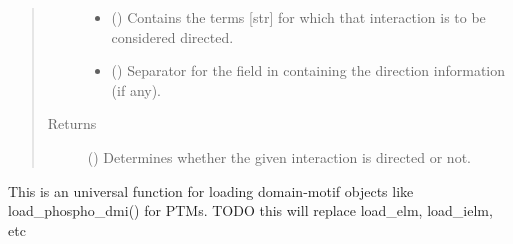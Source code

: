 \documentclass[letterpaper,10pt,english]{sphinxmanual}
\begin{document}
\begin{fulllineitems}
\begin{fulllineitems}
\begin{quote}
\begin{description}
\begin{itemize}
\item {} 
 () \textendash{} Contains the terms {[}str{]} for which that interaction is to be
considered directed.

\item {} 
 () \textendash{} Separator for the field in  containing the direction
information (if any).

\end{itemize}

\item[{Returns}] \leavevmode
() \textendash{} Determines whether the given interaction is
directed or not.

\end{description}\end{quote}

\end{fulllineitems}


\begin{fulllineitems}
\label{\detokenize{main:pypath.main.PyPath.process_directions}}
\end{fulllineitems}


\begin{fulllineitems}
\label{\detokenize{main:pypath.main.PyPath.process_dmi}}
This is an universal function
for loading domain-motif objects
like load\_phospho\_dmi() for PTMs.
TODO this will replace load\_elm, load\_ielm, etc

\end{fulllineitems}



\end{fulllineitems}
\end{document}
